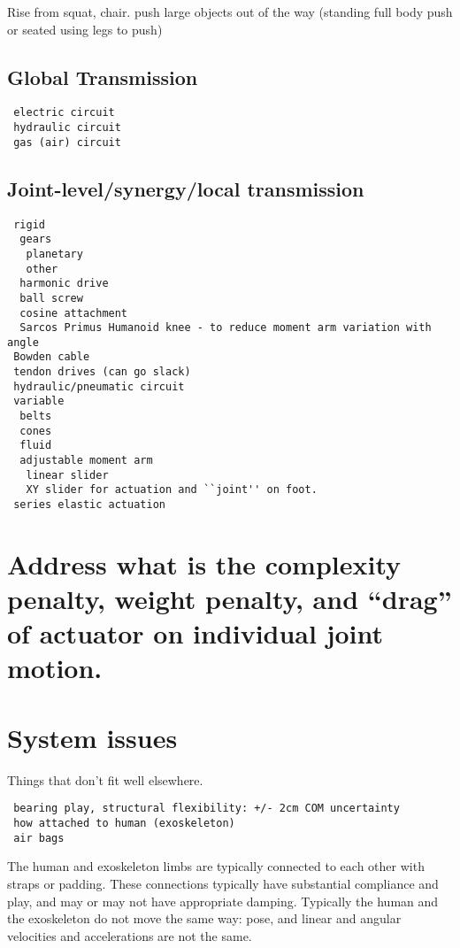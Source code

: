 \documentclass[letterpaper,12pt,fullpage]{article}
\begin{document}
Rise from squat, chair.
push large objects out of the way (standing full body push
or seated using legs to push)

\subsection{Global Transmission}

\begin{verbatim}
 electric circuit
 hydraulic circuit
 gas (air) circuit
\end{verbatim}

\subsection{Joint-level/synergy/local transmission}

\begin{verbatim}
 rigid
  gears
   planetary
   other
  harmonic drive
  ball screw
  cosine attachment
  Sarcos Primus Humanoid knee - to reduce moment arm variation with angle
 Bowden cable
 tendon drives (can go slack)
 hydraulic/pneumatic circuit
 variable
  belts
  cones
  fluid
  adjustable moment arm
   linear slider
   XY slider for actuation and ``joint'' on foot.
 series elastic actuation
\end{verbatim}

\section{Address what is the complexity penalty, weight penalty, 
and ``drag'' of actuator on individual joint motion.}

\section{System issues}

Things that don't fit well elsewhere.

\begin{verbatim}
 bearing play, structural flexibility: +/- 2cm COM uncertainty
 how attached to human (exoskeleton)
 air bags
\end{verbatim}

The human and exoskeleton limbs are typically connected to each
other with straps or padding. These connections typically have substantial
compliance and play, and may or may not have appropriate damping.
Typically the human and the exoskeleton do not move the same way:
pose, and linear and angular velocities and accelerations are not the same.
\end{document}
